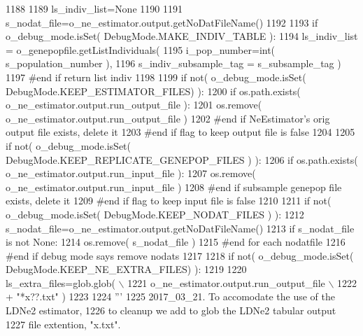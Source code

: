 \begin{DoxyCode}
1188 
1189         ls\_indiv\_list=\textcolor{keywordtype}{None}
1190 
1191         s\_nodat\_file=o\_ne\_estimator.output.getNoDatFileName()
1192 
1193         \textcolor{keywordflow}{if} o\_debug\_mode.isSet( DebugMode.MAKE\_INDIV\_TABLE ):
1194             ls\_indiv\_list = o\_genepopfile.getListIndividuals( 
1195                     i\_pop\_number=int( s\_population\_number ), 
1196                     s\_indiv\_subsample\_tag = s\_subsample\_tag )   
1197         \textcolor{comment}{#end if return list indiv}
1198         
1199         \textcolor{keywordflow}{if} not( o\_debug\_mode.isSet( DebugMode.KEEP\_ESTIMATOR\_FILES) ):
1200             \textcolor{keywordflow}{if} os.path.exists( o\_ne\_estimator.output.run\_output\_file ):
1201                 os.remove( o\_ne\_estimator.output.run\_output\_file )
1202             \textcolor{comment}{#end if NeEstimator's orig output file exists, delete it}
1203         \textcolor{comment}{#end if flag to keep output file is false}
1204 
1205         \textcolor{keywordflow}{if} not( o\_debug\_mode.isSet( DebugMode.KEEP\_REPLICATE\_GENEPOP\_FILES ) ):
1206             \textcolor{keywordflow}{if} os.path.exists( o\_ne\_estimator.output.run\_input\_file ):
1207                 os.remove( o\_ne\_estimator.output.run\_input\_file )
1208             \textcolor{comment}{#end if subsample genepop file exists, delete it}
1209         \textcolor{comment}{#end if flag to keep input file is false}
1210 
1211         \textcolor{keywordflow}{if} not( o\_debug\_mode.isSet( DebugMode.KEEP\_NODAT\_FILES ) ):
1212             s\_nodat\_file=o\_ne\_estimator.output.getNoDatFileName()
1213             \textcolor{keywordflow}{if} s\_nodat\_file \textcolor{keywordflow}{is} \textcolor{keywordflow}{not} \textcolor{keywordtype}{None}:
1214                 os.remove( s\_nodat\_file )
1215             \textcolor{comment}{#end for each nodatfile}
1216         \textcolor{comment}{#end if debug mode says remove nodats}
1217 
1218         \textcolor{keywordflow}{if} not( o\_debug\_mode.isSet( DebugMode.KEEP\_NE\_EXTRA\_FILES) ):
1219 
1220             ls\_extra\_files=glob.glob( \(\backslash\)
1221                     o\_ne\_estimator.output.run\_output\_file \(\backslash\)
1222                     + \textcolor{stringliteral}{"*x??.txt"} )
1223 
1224             \textcolor{stringliteral}{'''}
1225 \textcolor{stringliteral}{            2017\_03\_21. To accomodate the use of the  LDNe2 estimator, }
1226 \textcolor{stringliteral}{            to cleanup we add to glob the LDNe2 tabular output}
1227 \textcolor{stringliteral}{            file extention, "x.txt".}

\end{DoxyCode}
